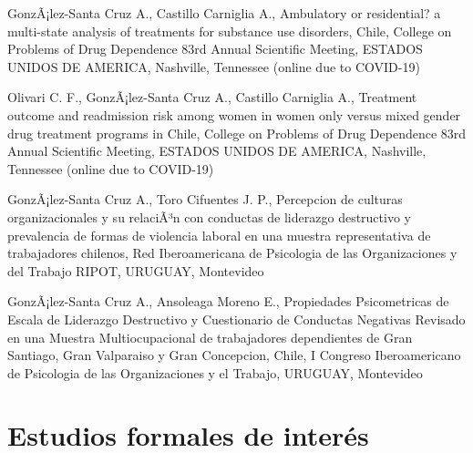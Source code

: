 \documentclass[11pt,a4paper,]{awesome-cv}
\begin{document}
\begin{cventries}
{\begin{cvitems}
\item GonzÃ¡lez-Santa Cruz A., Castillo Carniglia A., Ambulatory or residential? a multi-state analysis of treatments for substance use disorders, Chile, College on Problems of Drug Dependence 83rd Annual Scientific Meeting, ESTADOS UNIDOS DE AMERICA, Nashville, Tennessee (online due to COVID-19)
\item Olivari C. F., GonzÃ¡lez-Santa Cruz A., Castillo Carniglia A., Treatment outcome and readmission risk among women in women only versus mixed gender drug treatment programs in Chile, College on Problems of Drug Dependence 83rd Annual Scientific Meeting, ESTADOS UNIDOS DE AMERICA, Nashville, Tennessee (online due to COVID-19)
\item GonzÃ¡lez-Santa Cruz A., Toro Cifuentes J. P., Percepcion de culturas organizacionales y su relaciÃ³n con conductas de liderazgo destructivo y prevalencia de formas de violencia laboral en una muestra representativa de trabajadores chilenos, Red Iberoamericana de Psicologia de las Organizaciones y del Trabajo RIPOT, URUGUAY, Montevideo
\item GonzÃ¡lez-Santa Cruz A., Ansoleaga Moreno E., Propiedades Psicometricas de Escala de Liderazgo Destructivo y Cuestionario de Conductas Negativas Revisado en una Muestra Multiocupacional de trabajadores dependientes de Gran Santiago, Gran Valparaiso y Gran Concepcion, Chile, I Congreso Iberoamericano de Psicologia de las Organizaciones y el Trabajo, URUGUAY, Montevideo
\end{cvitems}}
\end{cventries}

\hypertarget{estudios-formales-de-interuxe9s}{%
\section{Estudios formales de
interés}\label{estudios-formales-de-interuxe9s}}

\begin{cventries}
    \vspace{-4.0mm}
    \vspace{-4.0mm}
    \vspace{-4.0mm}
    \vspace{-4.0mm}
\end{cventries}
\end{document}
